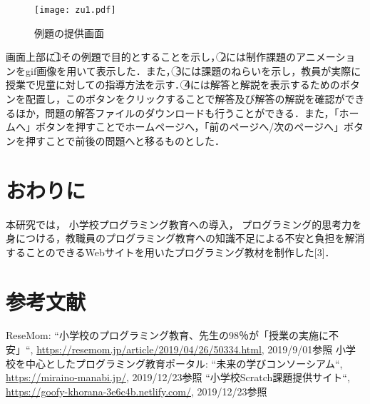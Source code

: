 \documentclass[twocolumn,10pt,a4j]{jsarticle}
\begin{document}
\begin{figure}[h]
\begin{center}
\texttt{[image: zu1.pdf]}
\end{center}
\caption{例題の提供画面}
\label{fig:教科書}
\end{figure}

画面上部に\textcircled{\scriptsize 1}その例題で目的とすることを示し，\textcircled{\scriptsize 2}には制作課題のアニメーションをgif画像を用いて表示した．また，\textcircled{\scriptsize 3}には課題のねらいを示し，教員が実際に授業で児童に対しての指導方法を示す．\textcircled{\scriptsize 4}には解答と解説を表示するためのボタンを配置し，このボタンをクリックすることで解答及び解答の解説を確認ができるほか，問題の解答ファイルのダウンロードも行うことができる．また，「ホームへ」ボタンを押すことでホームページへ，「前のページへ/次のページへ」ボタンを押すことで前後の問題へと移るものとした．

\section{おわりに}
本研究では， 小学校プログラミング教育への導入， プログラミング的思考力を身につける，教職員のプログラミング教育への知識不足による不安と負担を解消することのできるWebサイトを用いたプログラミング教材を制作した[3]．

\section{参考文献}
\begin{thebibliography}{99}
 ReseMom: ``小学校のプログラミング教育、先生の98％が「授業の実施に不安」``, \url{https://resemom.jp/article/2019/04/26/50334.html}, 2019/9/01参照
 小学校を中心としたプログラミング教育ポータル: ``未来の学びコンソーシアム``, \url{https://miraino-manabi.jp/}, 2019/12/23参照
  ``小学校Scratch課題提供サイト``, \url{https://goofy-khorana-3e6c4b.netlify.com/}, 2019/12/23参照
\end{thebibliography}
\end{document}

